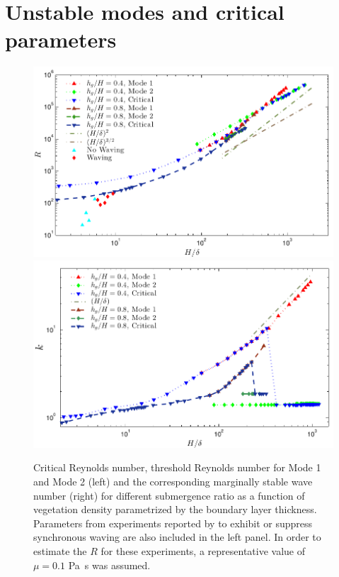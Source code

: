 \documentclass[12pt]{report}   %
\newcommand{\Rey}{{R}}
\begin{document}
\section{Unstable modes and critical parameters}
\begin{figure}
\begin{center}
\includegraphics[scale = 0.95]{new_graph_R_vs_delta}\\
\includegraphics[scale = 0.95]{new_graph_K_vs_delta}
\end{center}
\caption{
Critical Reynolds number, threshold Reynolds number for Mode 1 and Mode 2 (left) and the corresponding marginally stable wave number (right) for different submergence ratio as a function of vegetation density parametrized by the boundary layer thickness. 
Parameters from experiments reported by \cite{Ghisal02} to exhibit or suppress synchronous waving are also included in the left panel. 
In order to estimate the $\Rey$ for these experiments, a representative value of $\mu=0.1$ Pa~s was assumed.
}
\label{Re_vs_delta}
\end{figure}
\end{document}
